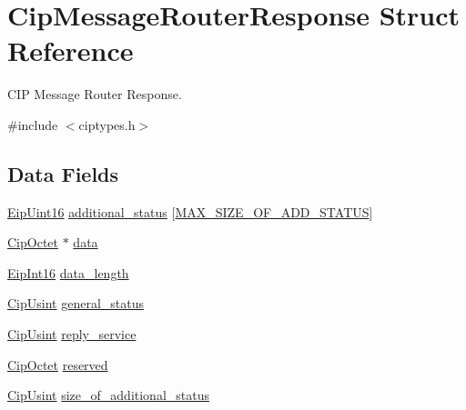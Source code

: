 \hypertarget{structCipMessageRouterResponse}{\section{\-Cip\-Message\-Router\-Response \-Struct \-Reference}
\label{d0/d1f/structCipMessageRouterResponse}
}


\-C\-I\-P \-Message \-Router \-Response.  




{\ttfamily \#include $<$ciptypes.\-h$>$}

\subsection*{\-Data \-Fields}
\begin{DoxyCompactItemize}
\item 
\hyperlink{typedefs_8h_ac1b4cfa25b4f5def62f23b455dd395d8}{\-Eip\-Uint16} \hyperlink{structCipMessageRouterResponse_ab779a25335c5fe122f7f6a87edd1288d}{additional\-\_\-status} \mbox{[}\hyperlink{ciptypes_8h_a76032ec3319954c70deea1f039deeb19}{\-M\-A\-X\-\_\-\-S\-I\-Z\-E\-\_\-\-O\-F\-\_\-\-A\-D\-D\-\_\-\-S\-T\-A\-T\-U\-S}\mbox{]}
\item 
\hyperlink{typedefs_8h_ab1d6828b2df519496de8762b3ffd54b1}{\-Cip\-Octet} $\ast$ \hyperlink{structCipMessageRouterResponse_a20feba97168b4551ba1e483e9cf568ec}{data}
\item 
\hyperlink{typedefs_8h_a3112f543eced50bf7680d12202c50f60}{\-Eip\-Int16} \hyperlink{structCipMessageRouterResponse_a1b6548497e7629c815b6f71b8dbaecbb}{data\-\_\-length}
\item 
\hyperlink{typedefs_8h_a378b726bef4c65cb2ec1c1cdf1205f52}{\-Cip\-Usint} \hyperlink{structCipMessageRouterResponse_ac41c087aef657407542cb640cdb44414}{general\-\_\-status}
\item 
\hyperlink{typedefs_8h_a378b726bef4c65cb2ec1c1cdf1205f52}{\-Cip\-Usint} \hyperlink{structCipMessageRouterResponse_a9bedd472cae3ed195d6fa894133bec6b}{reply\-\_\-service}
\item 
\hyperlink{typedefs_8h_ab1d6828b2df519496de8762b3ffd54b1}{\-Cip\-Octet} \hyperlink{structCipMessageRouterResponse_a76f1726a4fd8935f13ef55e6393398a9}{reserved}
\item 
\hyperlink{typedefs_8h_a378b726bef4c65cb2ec1c1cdf1205f52}{\-Cip\-Usint} \hyperlink{structCipMessageRouterResponse_a1b89b9d5962ad72516fb1c413857993a}{size\-\_\-of\-\_\-additional\-\_\-status}
\end{DoxyCompactItemize}


